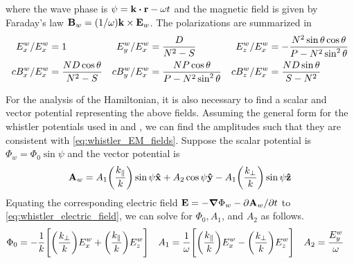 where the wave phase is $\psi=\vb{k}\vdot\vb{r}-\omega t$ and the magnetic field
is given by Faraday's law $\vb{B}_w=(1/\omega)\vb{k}\times\vb{E}_w$. The
polarizations are summarized in \cite{Tao&Bortnik2010}
\begin{align}\label{eq:whistler_polarizations}
    E_x^w/E_x^w&=1 &
    E_y^w/E_x^w&=\frac{D}{N^2-S} &
    E_z^w/E_x^w&=-\frac{N^2\sin\theta\cos\theta}{P-N^2\sin^2\theta}\notag\\
    cB_x^w/E_x^w&=\frac{ND\cos\theta}{N^2-S} &
    cB_y^w/E_x^w&=\frac{NP\cos\theta}{P-N^2\sin^2\theta} &
    cB_z^w/E_x^w&=\frac{ND\sin\theta}{S-N^2}
\end{align}

For the analysis of the Hamiltonian, it is also necessary to find a scalar and
vector potential representing the above fields. Assuming the general form for
the whistler potentials used in \cite{Karimabadi1990} and \cite{Roth1999}, we
can find the amplitudes such that they are consistent with
\cref{eq:whistler_EM_fields}.  Suppose the scalar potential is
$\Phi_w=\Phi_0\sin\psi$ and the vector potential is
\begin{equation}\label{eq:vector_potential}
    \vb{A}_w=A_1\qty(\frac{k_\parallel}{k})\sin\psi\vb{\hat{x}}+A_2\cos\psi\vb{\hat{y}}-A_1\qty(\frac{k_\bot}{k})\sin\psi\vb{\hat{z}}
\end{equation}
Equating the corresponding electric field
$\vb{E}=-\grad\Phi_w-\partial\vb{A}_w/\partial t$ to
\cref{eq:whistler_electric_field}, we can solve for $\Phi_0,A_1$, and $A_2$ as
follows.
\begin{align}
    \Phi_0&=-\frac1{k}\qty[\qty(\frac{k_\bot}{k})E_x^w+\qty(\frac{k_\parallel}{k})E_z^w]
          &
    A_1&=\frac1\omega\qty[\qty(\frac{k_\parallel}{k})E_x^w-\qty(\frac{k_\bot}{k})E_z^w]
       &
    A_2&=\frac{E_y^w}{\omega}
\end{align}

